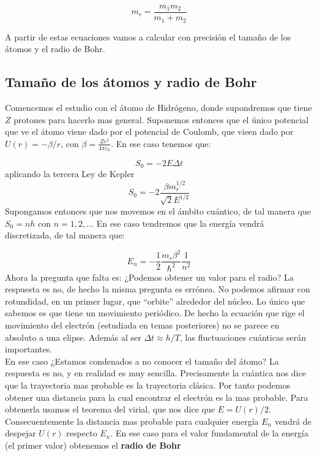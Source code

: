 \documentclass[12pt,a4paper]{article}
\numberwithin{equation}{section}
\numberwithin{figure}{section}
\begin{document}
\begin{equation}
m_r = \dfrac{m_1 m_2}{m_1 + m_2}
\end{equation}

A partir de estas ecuaciones vamos a calcular con precisión el tamaño de los átomos y el radio de Bohr. 

\subsection{Tamaño de los átomos y radio de Bohr}

Comencemos el estudio con el átomo de Hidrógeno, donde supondremos que tiene $Z$ protones para hacerlo mas general. Suponemos entonces que el único potencial que ve el átomo viene dado por el potencial de Coulomb, que vieen dado por $U(r) = - \beta /r$, con $\beta = \frac{Ze^2}{4 \pi \varepsilon_0}$. En ese caso tenemos que:

$$ S_0 = - 2 E \Delta t $$
aplicando la tercera Ley de Kepler
$$ S_0 = - 2 \dfrac{\beta m_r^{1/2}}{\sqrt{2} E^{1/2}} $$
Supongamos entonces que nos movemos en el ámbito cuántico, de tal manera que $S_0 = n h $ con $n=1,2,...$ En ese caso tendremos que la energía vendrá discretizada, de tal manera que:

\begin{equation}
E_n = - \dfrac{1}{2} \dfrac{m_r \beta^2}{\hbar^2} \dfrac{1}{n^2}
\end{equation}
Ahora la pregunta que falta es: ¿Podemos obtener un valor para el radio? La respuesta es no, de hecho la misma pregunta es errónea. No podemos afirmar con rotundidad, en un primer lugar, que ``orbite'' alrededor del núcleo. Lo único que sabemos es que tiene un movimiento periódico. De hecho la ecuación que rige el movimiento del electrón (estudiada en temas posteriores) no se parece en absoluto a una elipse. Además al ser $\Delta t \approx h/T$, las fluctuaciones cuánticas serán importantes. \\

En ese caso ¿Estamos condenados a no conocer el tamaño del átomo? La respuesta es no, y en realidad es muy sencilla. Precisamente la cuántica nos dice que la trayectoria mas probable es la trayectoria clásica. Por tanto podemos obtener una distancia para la cual encontrar el electrón es la mas probable. Para obtenerla usamos el teorema del virial, que nos dice que $E = U(r)/2$. Consecuentemente la distancia mas probable para cualquier energía $E_n$ vendrá de despejar $U(r)$ respecto $E_n$. En ese caso para el valor fundamental de la energía (el primer valor) obtenemos el \textbf{radio de Bohr}
\end{document}
